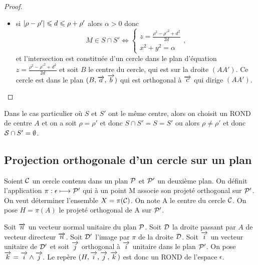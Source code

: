 \begin{proof}
\begin{itemize}
  \item si \(\abs{\rho-\rho'}\leqslant d \leqslant \rho+\rho'\) alors \(\alpha>0\) donc
    \begin{equation}
      M\in S\cap S' \iff \begin{cases} z=\frac{\rho^2-\rho'^2+d^2}{2d} \\x^2+y^2=\alpha\end{cases},
    \end{equation}
    et l'intersection est constituée d'un cercle dans le plan d'équation \(z=\frac{\rho^2-\rho'^2+d^2}{2d}\) et soit \(B\) le centre du cercle, qui est sur la droite \((AA')\). Ce cercle est dans le plan \((B,\va,\vb)\) qui est orthogonal à \(\vc\) qui dirige \((AA')\).
  \end{itemize}
\end{proof}
Dans le cas particulier où \(S\) et \(S'\) ont le même centre, alors on choisit un ROND de centre \(A\) et on a soit \(\rho=\rho'\) et donc \(S\cap S'=S=S'\) ou alors \(\rho\neq \rho'\) et donc \(\S\cap S' =\emptyset\).

\subsection{Projection orthogonale d'un cercle sur un plan}

Soient \(\courbe\) un cercle contenu dans un plan \(\P\) et \(\P'\) un deuxième plan. On définit l'application \(\pi:\epsilon \longmapsto \P'\) qui à un point M associe son projeté orthogonal sur \(\P'\). On veut déterminer l'ensemble \(X=\pi(\courbe)\). On note A le centre du cercle \(\courbe\). On pose \(H=\pi(A)\) le projeté orthogonal de A sur \(\P'\). 

Soit \(\vn\) un vecteur normal unitaire du plan \(\P\). Soit \(\Dr\) la droite passant par \(A\) de vecteur directeur \(\vn\). Soit \(\Dr'\) l'image par \(\pi\) de la droite \(\Dr\). Soit \(\vi\) un vecteur unitaire de \(\Dr'\) et soit \(\vj\) orthogonal à \(\vi\) unitaire dans le plan \(\P'\). On pose \(\vk=\vi\wedge \vj\). Le repère \((H,\vi,\vj,\vk)\) est donc un ROND de l'espace \(\epsilon\).

